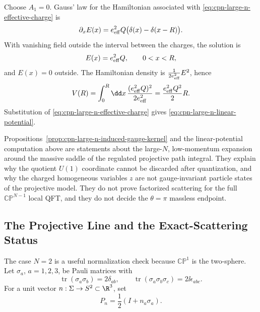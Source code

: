 Choose \(A_1=0\).  Gauss' law for the Hamiltonian associated with
\eqref{eq:cpn-large-n-effective-charge} is
\[
  \partial_x E(x)=e_{\rm eff}^2Q\bigl(\delta(x)-\delta(x-R)\bigr).
\]
With vanishing field outside the interval between the charges, the solution is
\[
  E(x)=e_{\rm eff}^2Q,\qquad 0<x<R,
\]
and \(E(x)=0\) outside.  The Hamiltonian density is
\(\frac1{2e_{\rm eff}^2}E^2\), hence
\[
  V(R)=\int_0^R\dd x\,\frac{(e_{\rm eff}^2Q)^2}{2e_{\rm eff}^2}
  =
  \frac{e_{\rm eff}^2Q^2}{2}R.
\]
Substitution of \eqref{eq:cpn-large-n-effective-charge} gives
\eqref{eq:cpn-large-n-linear-potential}.

\begin{controlledapproximation}
\label{ca:cpn-large-n-induced-gauge-status}
Propositions~\ref{prop:cpn-large-n-induced-gauge-kernel} and
the linear-potential computation above are statements about the
large-\(N\), low-momentum expansion around the massive saddle of the
regulated projective path integral.  They explain why the quotient \(U(1)\)
coordinate cannot be discarded after quantization, and why the charged
homogeneous variables \(z\) are not gauge-invariant particle states of the
projective model.  They do not prove factorized scattering for the full
\(\mathbb{CP}^{N-1}\) local QFT, and they do not decide the \(\theta=\pi\)
massless endpoint.
\end{controlledapproximation}

\subsection{The Projective Line and the Exact-Scattering Status}
\label{subsec:cp1-o3-and-projective-status}

The case \(N=2\) is a useful normalization check because
\(\mathbb{CP}^1\) is the two-sphere.  Let \(\sigma_a\),
\(a=1,2,3\), be Pauli matrices with
\[
  \operatorname{tr}(\sigma_a\sigma_b)=2\delta_{ab},\qquad
  \operatorname{tr}(\sigma_a\sigma_b\sigma_c)=2\ii\epsilon_{abc}.
\]
For a unit vector \(n:\Sigma\to S^2\subset\R^3\), set
\begin{equation}
  P_n=\frac12(I+n_a\sigma_a).
  \label{eq:cp1-projector-pauli}
\end{equation}

